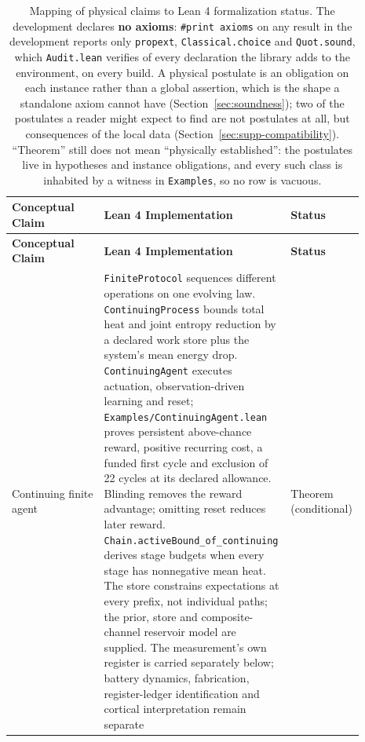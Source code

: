 \documentclass{article}
\begin{document}
\begingroup
\scriptsize
\singlespacing
\setlength{\LTcapwidth}{\linewidth}
\begin{longtable}{|>{\raggedright\arraybackslash}p{0.26\linewidth}|>{\raggedright\arraybackslash}p{0.46\linewidth}|>{\raggedright\arraybackslash}p{0.17\linewidth}|}
\caption{Mapping of physical claims to Lean 4 formalization status. The development declares \textbf{no axioms}: \texttt{\#print axioms} on any result in the development reports only \texttt{propext}, \texttt{Classical.choice} and \texttt{Quot.sound}, which \texttt{Audit.lean} verifies of every declaration the library adds to the environment, on every build. A physical postulate is an obligation on each instance rather than a global assertion, which is the shape a standalone axiom cannot have (Section~\ref{sec:soundness}); two of the postulates a reader might expect to find are not postulates at all, but consequences of the local data (Section~\ref{sec:supp-compatibility}). ``Theorem'' still does not mean ``physically established'': the postulates live in hypotheses and instance obligations, and every such class is inhabited by a witness in \texttt{Examples}, so no row is vacuous.}\\
\hline
\textbf{Conceptual Claim} & \textbf{Lean 4 Implementation} & \textbf{Status} \\ \hline
\endfirsthead
\hline
\textbf{Conceptual Claim} & \textbf{Lean 4 Implementation} & \textbf{Status} \\ \hline
\endhead
Continuing finite agent & \texttt{FiniteProtocol} sequences different operations on one evolving law. \texttt{ContinuingProcess} bounds total heat and joint entropy reduction by a declared work store plus the system's mean energy drop. \texttt{ContinuingAgent} executes actuation, observation-driven learning and reset; \nolinkurl{Examples/ContinuingAgent.lean} proves persistent above-chance reward, positive recurring cost, a funded first cycle and exclusion of 22 cycles at its declared allowance. Blinding removes the reward advantage; omitting reset reduces later reward. \nolinkurl{Chain.activeBound_of_continuing} derives stage budgets when every stage has nonnegative mean heat. The store constrains expectations at every prefix, not individual paths; the prior, store and composite-channel reservoir model are supplied. The measurement's own register is carried separately below; battery dynamics, fabrication, register-ledger identification and cortical interpretation remain separate & Theorem (conditional) \\ \hline

\end{longtable}
\end{document}
